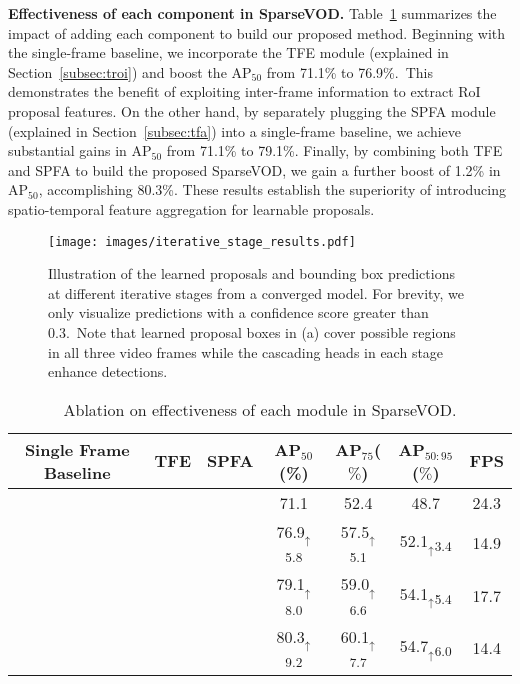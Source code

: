 \documentclass{bmvc2k}
\begin{document}
\vspace{3pt}
\noindent \textbf{Effectiveness of each component in SparseVOD.} 
\hspace{1pt}
Table~\ref{table:ablation_each_module} summarizes the impact of adding each component to build our proposed method. Beginning with the single-frame baseline, we incorporate the TFE module (explained in Section~\ref{subsec:troi}) and boost the AP$_{50}$ from 71.1\% to 76.9\%.~This demonstrates the benefit of exploiting inter-frame information to extract RoI proposal features. On the other hand, by separately plugging the SPFA module (explained in Section~\ref{subsec:tfa}) into a single-frame baseline, we achieve substantial gains in AP$_{50}$ from 71.1\% to 79.1\%. Finally, by combining both TFE and SPFA to build the proposed SparseVOD, we gain a further boost of 1.2\% in AP$_{50}$, accomplishing 80.3\%. These results establish the superiority of introducing spatio-temporal feature aggregation for learnable proposals.
\begin{figure}[H]
\centering
\vspace{-10pt}
\texttt{[image: images/iterative\_stage\_results.pdf]}
\vspace{-5pt}
\caption{Illustration of the learned proposals and bounding box predictions at different iterative stages from a converged model. For brevity, we only visualize predictions with a confidence score greater than 0.3.~Note that learned proposal boxes in (a) cover possible regions in all three video frames while the cascading heads in each stage enhance detections.}
\label{fig:iterative_results}
\vspace{-20pt}
\end{figure}
\newcommand{\cmark}{\ding{51}}\newcommand{\xmark}{\ding{55}}\begin{table}[H]
\small
\begin{center}
\begin{tabular}{ccc|cccc}
\toprule
Single Frame Baseline & TFE & SPFA  & AP$_{50}$(\%) &  AP$_{75}$($\%$)  &  AP$_{50:95}$($\%$)& FPS \\
\hline\noalign{\smallskip}
\textcolor{Green}{\cmark} & \color{red}\xmark & \color{red}\xmark  & 71.1 & 52.4 & 48.7 &  24.3 \\
 \color{Green}\cmark &  \color{Green}\cmark&  \color{red}\xmark & 76.9$_{\uparrow}$\textsubscript{5.8} & 57.5$_{\uparrow}$\textsubscript{5.1} &52.1$_{\uparrow}$\textsubscript{3.4} & 14.9 \\
 \color{Green}\cmark & \color{red}\xmark & \color{Green}\cmark& 79.1$_{\uparrow}$\textsubscript{8.0} & 59.0$_{\uparrow}$\textsubscript{6.6} & 54.1$_{\uparrow}$\textsubscript{5.4}& 17.7  \\
 \color{Green}\cmark &  \color{Green}\cmark& \color{Green}\cmark& 80.3$_{\uparrow}$\textsubscript{9.2} & 60.1$_{\uparrow}$\textsubscript{7.7} & 54.7$_{\uparrow}$\textsubscript{6.0} &  14.4 \\
\bottomrule
\end{tabular}
\end{center}
\vspace{-5pt}
\caption{Ablation on effectiveness of each module in SparseVOD.}
\label{table:ablation_each_module}
\vspace{-15pt}
\end{table}
\end{document}
